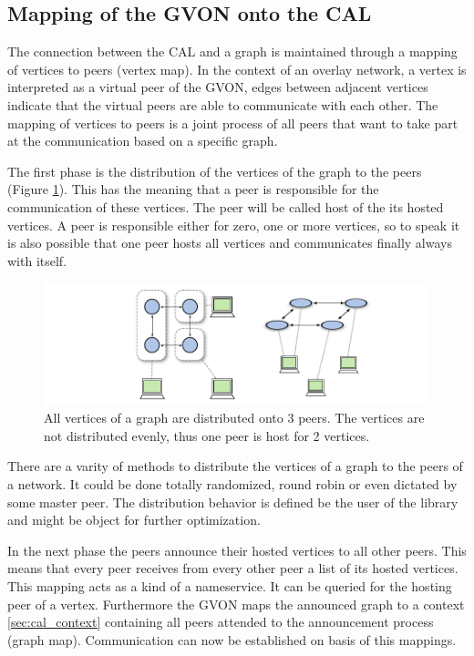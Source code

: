 \subsection{Mapping of the GVON onto the CAL}
\label{sec:mapping}
The connection between the CAL and a graph is maintained through a
mapping of vertices to peers (vertex map). In the context of an
overlay network, a vertex is interpreted as a virtual peer of the GVON,
edges between adjacent vertices indicate that the virtual peers are
able to communicate with each other. The mapping of vertices to peers
is a joint process of all peers that want to take part at the
communication based on a specific graph.

The first phase is the distribution of the vertices of the graph to
the peers (Figure \ref{fig:gon_mapping}). This has the meaning that a
peer is responsible for the communication of these vertices. The peer
will be called host of the its hosted vertices. A peer is responsible
either for zero, one or more vertices, so to speak it is also possible
that one peer hosts all vertices and communicates finally always with
itself.

\begin{figure}[H]
  \centering \includegraphics[width=\textwidth]{graphics/30_gon_mapping}
  \caption{All vertices of a graph are distributed onto 3 peers. The vertices
  are not distributed evenly, thus one peer is host for 2 vertices.}
  \label{fig:gon_mapping}
\end{figure}

There are a varity of methods to distribute the vertices of a graph to
the peers of a network. It could be done totally randomized, round
robin or even dictated by some master peer. The distribution behavior
is defined be the user of the library and might be object for further
optimization.

In the next phase the peers announce their hosted vertices to all
other peers. This means that every peer receives from every other peer
a list of its hosted vertices. This mapping acts as a kind of a
nameservice. It can be queried for the hosting peer of a
vertex. Furthermore the GVON maps the announced graph to a context
\ref{sec:cal_context} containing all peers attended to the
announcement process (graph map). Communication can now be established
on basis of this mappings.

